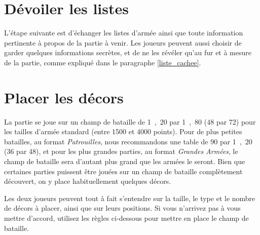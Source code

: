 \section{Dévoiler les listes}

L'étape suivante est d'échanger les listes d'armée ainsi que toute information pertinente à propos de la partie à venir. Les joueurs peuvent aussi choisir de garder quelques informations secrètes, et de ne les révéler qu'au fur et à mesure de la partie, comme expliqué dans le paragraphe \ref{liste_cachee}.

\section{Placer les décors}

La partie se joue sur un champ de bataille de \unit{1,20}{\meter} par \unit{1,80}{\meter} (\unit{48}{\pouce} par \unit{72}{\pouce}) pour les tailles d'armée standard (entre 1500 et 4000 points). Pour de plus petites batailles, au format \emph{Patrouilles}, nous recommandons une table de \unit{90}{\centi\meter} par \unit{1,20}{\meter} (\unit{36}{\pouce} par \unit{48}{\pouce}), et pour les plus grandes parties, au format \emph{Grandes Armées}, le champ de bataille sera d'autant plus grand que les armées le seront. Bien que certaines parties puissent être jouées sur un champ de bataille complètement découvert, on y place habituellement quelques décors.

Les deux joueurs peuvent tout à fait s'entendre sur la taille, le type et le nombre de décors à placer, ainsi que sur leurs positions. Si vous n'arrivez pas à vous mettre d'accord, utilisez les règles ci-dessous pour mettre en place le champ de bataille.

